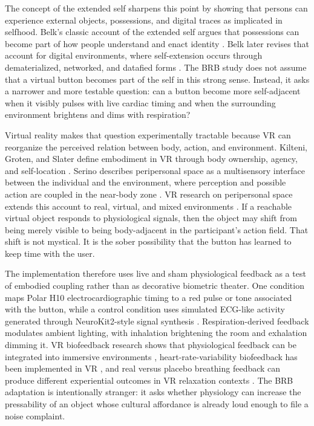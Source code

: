 The concept of the extended self sharpens this point by showing that persons can experience external objects, possessions, and digital traces as implicated in selfhood. Belk's classic account of the extended self argues that possessions can become part of how people understand and enact identity \citep{Belk1988ExtendedSelf}. Belk later revises that account for digital environments, where self-extension occurs through dematerialized, networked, and datafied forms \citep{Belk2013ExtendedSelfDigital}. The BRB study does not assume that a virtual button becomes part of the self in this strong sense. Instead, it asks a narrower and more testable question: can a button become more self-adjacent when it visibly pulses with live cardiac timing and when the surrounding environment brightens and dims with respiration?

Virtual reality makes that question experimentally tractable because VR can reorganize the perceived relation between body, action, and environment. Kilteni, Groten, and Slater define embodiment in VR through body ownership, agency, and self-location \citep{KilteniEtAl2012}. Serino describes peripersonal space as a multisensory interface between the individual and the environment, where perception and possible action are coupled in the near-body zone \citep{Serino2019}. VR research on peripersonal space extends this account to real, virtual, and mixed environments \citep{SerinoEtAl2018}. If a reachable virtual object responds to physiological signals, then the object may shift from being merely visible to being body-adjacent in the participant's action field. That shift is not mystical. It is the sober possibility that the button has learned to keep time with the user.

The implementation therefore uses live and sham physiological feedback as a test of embodied coupling rather than as decorative biometric theater. One condition maps Polar H10 electrocardiographic timing to a red pulse or tone associated with the button, while a control condition uses simulated ECG-like activity generated through NeuroKit2-style signal synthesis \citep{MakowskiEtAl2021}. Respiration-derived feedback modulates ambient lighting, with inhalation brightening the room and exhalation dimming it. VR biofeedback research shows that physiological feedback can be integrated into immersive environments \citep{LueddeckeFelnhofer2022}, heart-rate-variability biofeedback has been implemented in VR \citep{RockstrohEtAl2019}, and real versus placebo breathing feedback can produce different experiential outcomes in VR relaxation contexts \citep{ChittaroEtAl2024}. The BRB adaptation is intentionally stranger: it asks whether physiology can increase the pressability of an object whose cultural affordance is already loud enough to file a noise complaint.

